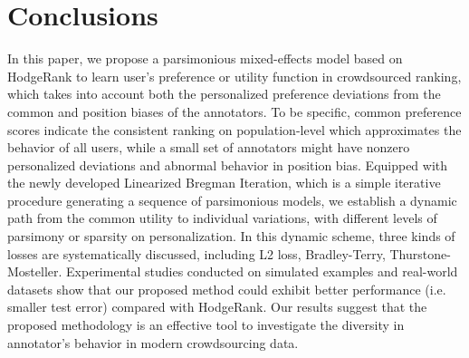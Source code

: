 \documentclass[10pt,journal,cspaper,compsoc]{IEEEtran}
\begin{document}
{{\begin{table}[h]
\begin{lrbox}{\tablebox}
\begin{tabular}{||c|c|c|c||c|c|c|c||}
 \hline
\end {tabular}
\medskip
\end{lrbox}
\scalebox{1}{\usebox{\tablebox}}
\end{table}
\par}










\section{Conclusions}\label{sec:conclusion}

In this paper, we propose a parsimonious mixed-effects model based on HodgeRank to learn user's preference or utility function in crowdsourced ranking, which
takes into account both the personalized preference deviations from the common and position biases of the annotators.
To be specific, common preference scores indicate the consistent ranking on population-level which approximates the behavior of
all users, while a small set of annotators might have nonzero
personalized deviations and abnormal behavior in position bias. Equipped with the newly developed Linearized
Bregman Iteration, which is a simple iterative procedure generating a sequence of parsimonious models,  we establish a dynamic path from the common utility to individual
variations, with different levels of parsimony or sparsity on personalization. In this dynamic scheme, three kinds of losses are systematically discussed, including  L2 loss, Bradley-Terry, Thurstone-Mosteller.
Experimental studies conducted on simulated examples and real-world
datasets show that our proposed method could exhibit better performance (i.e.
smaller test error) compared with HodgeRank. 
Our results suggest that the proposed methodology is an effective tool to investigate the diversity in annotator's behavior
in modern crowdsourcing data.

\ifCLASSOPTIONcaptionsoff
  \newpage
\fi



 

}
\end{document}
